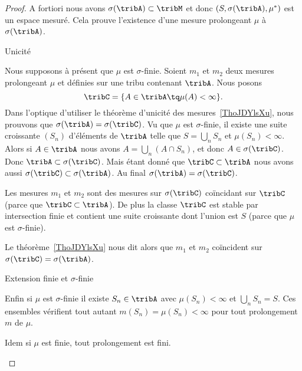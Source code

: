 \begin{proof}
    A fortiori nous avons \( \sigma(\tribA)\subset\tribM\) et donc \( (S,\sigma(\tribA),\mu^*)\) est un espace mesuré. Cela prouve l'existence d'une mesure prolongeant \( \mu\) à \( \sigma(\tribA)\).

    \begin{subproof}
        \item[Unicité]

            Nous supposons à présent que \( \mu\) est \( \sigma\)-finie. Soient \( m_1\) et \( m_2\) deux mesures prolongeant \( \mu\) et définies sur une tribu contenant \( \tribA\). Nous posons
            \begin{equation}
                \tribC=\{ A\in\tribA\tq\mu(A)<\infty \}.
            \end{equation}
            Dans l'optique d'utiliser le théorème d'unicité des mesures~\ref{ThoJDYlsXu}, nous prouvons que \( \sigma(\tribA)=\sigma(\tribC)\). Vu que \( \mu\) est \( \sigma\)-finie, il existe une suite croissante \( (S_n)\) d'éléments de \( \tribA\) telle que \( S=\bigcup_nS_n\) et \( \mu(S_n)<\infty\). Alors si \( A\in\tribA\) nous avons \( A=\bigcup_n(A\cap S_n)\), et donc \( A\in\sigma(\tribC)\). Donc \( \tribA\subset\sigma(\tribC)\). Mais étant donné que \( \tribC\subset\tribA\) nous avons aussi \( \sigma(\tribC)\subset\sigma(\tribA)\). Au final \( \sigma(\tribA)=\sigma(\tribC)\).

            Les mesures \( m_1\) et \( m_2\) sont des mesures sur \( \sigma(\tribC)\) coïncidant sur \( \tribC\) (parce que \( \tribC\subset\tribA\)). De plus la classe \( \tribC\) est stable par intersection finie et contient une suite croissante dont l'union est \( S\) (parce que \( \mu\) est \( \sigma\)-finie).

            Le théorème~\ref{ThoJDYlsXu} nous dit alors que \( m_1\) et \( m_2\) coïncident sur \( \sigma(\tribC)=\sigma(\tribA)\).

        \item[Extension finie et \( \sigma\)-finie]

            Enfin si \( \mu\) est \( \sigma\)-finie il existe \( S_n\in\tribA\) avec \( \mu(S_n)<\infty\) et \( \bigcup_nS_n=S\). Ces ensembles vérifient tout autant \( m(S_n)=\mu(S_n)<\infty\) pour tout prolongement \( m\) de \( \mu\).

            Idem si \( \mu\) est finie, tout prolongement est fini.
    \end{subproof}
\end{proof}

